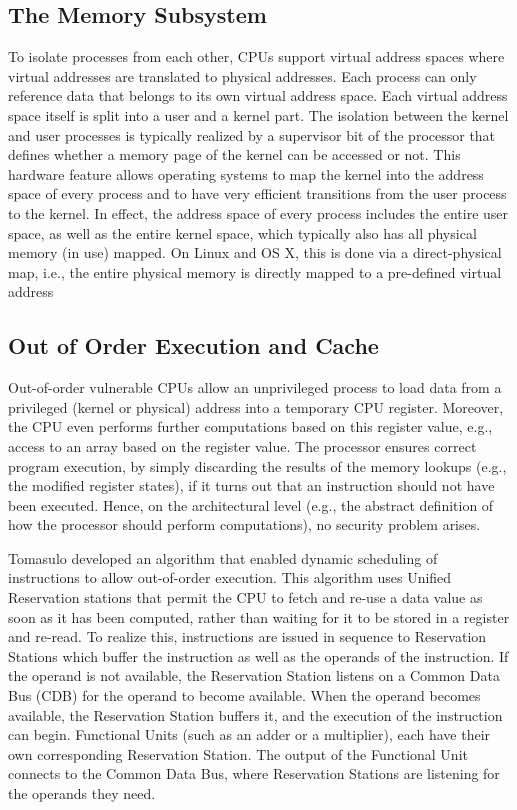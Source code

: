 \documentclass[runningheads]{llncs}
\begin{document}
\subsection{The Memory Subsystem}
To isolate processes from each other, CPUs support virtual address spaces where virtual addresses are translated to physical addresses. Each process can only reference data that belongs to its own virtual address space. Each virtual address space itself is split into a user and a kernel part. The isolation between the kernel and user processes is typically realized by a supervisor bit of the processor that defines whether a memory page of the kernel can be accessed or not.  This hardware feature allows operating systems to map the kernel into the address space of every process and to have very efficient transitions from the user process to the kernel. In effect, the address space of every process includes the entire user space, as well as the entire kernel space, which typically also has all physical memory (in use) mapped. On Linux and OS X, this is done via a direct-physical map, i.e., the entire physical memory is directly mapped to a pre-defined virtual address

\subsection{Out of Order Execution and Cache}
Out-of-order vulnerable CPUs allow an unprivileged process to load data from a privileged (kernel or physical) address into a temporary CPU register. Moreover, the CPU even performs further computations based on this register value, e.g., access to an array based on the register value. The processor ensures correct program execution, by simply discarding the results of the memory lookups (e.g., the modified register states), if it turns out that an instruction should not have been executed. Hence, on the architectural level (e.g., the abstract definition of how the processor should perform computations), no security problem arises. 

Tomasulo developed an algorithm that enabled dynamic scheduling of instructions to allow out-of-order execution. This algorithm uses Unified Reservation stations that permit the CPU to fetch and re-use a data value as soon as it has been computed, rather than waiting for it to be stored in a register and re-read. To realize this, instructions are issued in sequence to Reservation Stations which buffer the instruction as well as the operands of the instruction. If the operand is not available, the Reservation Station listens on a Common Data Bus (CDB) for the operand to become available. When the operand becomes available, the Reservation Station buffers it, and the execution of the instruction can begin. Functional Units (such as an adder or a multiplier), each have their own corresponding Reservation Station. The output of the Functional Unit connects to the Common Data Bus, where Reservation Stations are listening for the operands they need.
\end{document}
